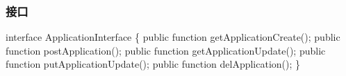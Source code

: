 \documentclass[a4paper,fancyhdr,fntef,hyperref]{ctexart}
\newenvironment{Shaded}{}{}
\newcommand{\NormalTok}[1]{{#1}}
\begin{document}
\subsubsection{接口}\label{ux63a5ux53e3-3}

\begin{Shaded}
\begin{Highlighting}[]
\NormalTok{interface ApplicationInterface \{}
    \NormalTok{public function getApplicationCreate();}
    \NormalTok{public function postApplication();}
    \NormalTok{public function getApplicationUpdate();}
    \NormalTok{public function putApplicationUpdate();}
    \NormalTok{public function delApplication();}
\NormalTok{\}}
\end{Highlighting}
\end{Shaded}
\end{document}
